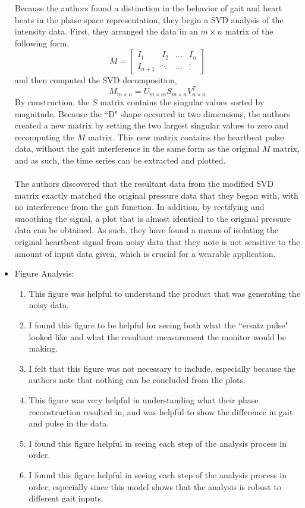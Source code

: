 \documentclass[letterpaper,10pt]{article}
\begin{document}
\begin{itemize}
Because the authors found a distinction in the behavior of gait and heart beats in the phase space representation, they begin a SVD analysis of the intensity data. First, they arranged the data in an $m\times n$ matrix of the following form,
\[M=\begin{bmatrix}
I_1 & I_{2} & \ldots & I_{n}\\
I_{n+1} & \ddots & \ldots & \vdots
\end{bmatrix}\]
and then computed the SVD decomposition,
\[M_{m\times n}=U_{m\times m}S_{m\times n}V^T_{n\times n}\]
By construction, the $S$ matrix contains the singular values sorted by magnitude. Because the ``D" shape occurred in two dimensions, the authors created a new matrix by setting the two largest singular values to zero and recomputing the $M$ matrix. This new matrix contains the heartbeat pulse data, without the gait interference in the same form as the original $M$ matrix, and as such, the time series can be extracted and plotted.\\\\
The authors discovered that the resultant data from the modified SVD matrix exactly matched the original pressure data that they began with, with no interference from the gait function. In addition, by rectifying and smoothing the signal, a plot that is almost identical to the original pressure data can be obtained. As such, they have found a means of isolating the original heartbeat signal from noisy data that they note is not sensitive to the amount of input data given, which is crucial for a wearable application.
\item Figure Analysis:
\begin{enumerate}
\item This figure was helpful to understand the product that was generating the noisy data.
\item I found this figure to be helpful for seeing both what the ``ersatz pulse" looked like and what the resultant measurement the monitor would be making.
\item I felt that this figure was not necessary to include, especially because the authors note that nothing can be concluded from the plots.
\item This figure was very helpful in understanding what their phase reconstruction resulted in, and was helpful to show the difference in gait and pulse in the data.
\item I found this figure helpful in seeing each step of the analysis process in order.
\item I found this figure helpful in seeing each step of the analysis process in order, especially since this model shows that the analysis is robust to different gait inputs.

\end{enumerate}
\end{itemize}
\end{document}

